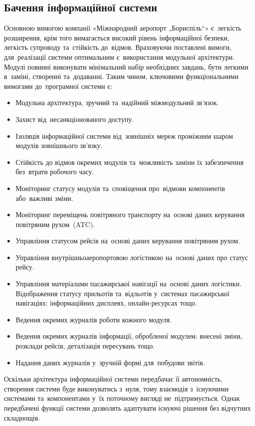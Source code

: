 \documentclass[
	a4paper,
	oneside,
	DIV = 12,
	12pt,
	headings = normal,
]{scrartcl}
\newcommand{\allcaps}[1]{{\addfontfeatures{LetterSpace = 5, Kerning = Off}#1}}
\begin{document}
			\subsection{Бачення інформаційної системи}
				Основною вимогою компанії «Міжнародний аеропорт „Бориспіль“» є~легкість розширення, крім того вимагається високий рівень інформаційної безпеки, легкість супроводу та~стійкість до~відмов. Враховуючи поставлені вимоги, для~реалізації системи оптимальним є~використання модульної архітектури. Модулі повинні виконувати мінімальний набір необхідних завдань, бути легкими в~заміні, створенні та~додаванні. Таким чином, ключовими функціональними вимогами до~програмної системи є:
				\begin{itemize}
					\item Модульна архітектура, зручний та~надійний міжмодульний зв'язок.
					\item Захист від~несанкціонованого доступу.
					\item Ізоляція інформаційної системи від~зовнішніх мереж проміжним шаром модулів зовнішнього зв'язку.
					\item Стійкість до відмов окремих модулів та~можливість заміни їх забезпечення без~втрати робочого часу.
					\item Моніторинг статусу модулів та~сповіщення про~відмови компонентів або~важливі зміни.
					\item Моніторинг переміщень повітряного транспорту на~основі даних керування повітряним рухом~(\allcaps{ATC}).
					\item Управління статусом рейсів на~основі даних керування повітряним рухом.
					\item Управління внутрішньоаеропортовою логістикою на~основі даних про статус рейсу.
					\item Управління матеріалами пасажирської навігації на~основі даних логістики. Відображення статусу прильотів та~відльотів у~системах пасажирської навігаціях: інформаційних дисплеях, онлайн-ресурсах тощо.
					\item Ведення окремих журналів роботи кожного модуля.
					\item Ведення окремих журналів інформації, обробленої модулем: внесені зміни, розклади рейсів, деталізація пересувань тощо.
					\item Надання даних журналів у~зручній формі для~побудови звітів.
				\end{itemize}

				Оскільки архітектура інформаційної системи передбачає її автономність, створення системи буде виконуватись з~нуля, тому взаємодія з~існуючими системами та~компонентами у~їх поточному вигляді не~підтримується. Однак передбачені функції системи дозволять адаптувати існуючі рішення без відчутних складнощів.
\end{document}

